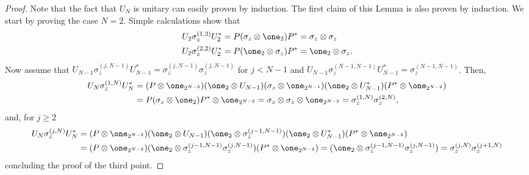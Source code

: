 \documentclass[aihp,12pt]{imsart}
\begin{document}
\begin{proof}
Note that the fact that $U_N$ is unitary can easily proven by induction.
    The first claim of this Lemma is also proven by induction. 
    We start by proving the case $N=2$. Simple calculations show that 
    \begin{align*}
        U_2\sigma_z^{(1,2)} U_2^* &= P (\sigma_z\otimes\one_2) P^* = \sigma_z\otimes\sigma_z\\
        U_2\sigma_z^{(2,2)} U_2^* &= P (\one_2\otimes\sigma_z) P^* = \one_2\otimes\sigma_z.
    \end{align*}
    Now assume that $U_{N-1}\sigma_z^{(j,N-1)}U_{N-1}^* = \sigma_z^{(j,N-1)}\sigma_z^{(j,N-1)}$ for $j<N-1$ and $U_{N-1}\sigma_z^{(N-1,N-1)}U_{N-1}^* = \sigma_z^{(N-1,N-1)}$. Then,
    \begin{align*}
        U_N\sigma_z^{(1,N)} U_N^* &= (P\otimes\one_{2^{N-2}})(\one_2\otimes U_{N-1}) (\sigma_z\otimes \one_{2^{N-1}}) (\one_2\otimes U_{N-1}^*) (P^*\otimes\one_{2^{N-2}})\\
        &= P(\sigma_z\otimes\one_2)P^* \otimes\one_{2^{N-2}} = \sigma_z\otimes\sigma_z\otimes\one_{2^{N-2}} = \sigma_z^{(1,N)}\sigma_z^{(2,N)},
    \end{align*}
    and, for $j\geq2$
    \begin{align*}
        U_N\sigma_z^{(j,N)} U_N^* &= (P\otimes\one_{2^{N-2}})(\one_2\otimes U_{N-1}) (\one_2\otimes \sigma_z^{(j-1,N-1)}) (\one_2\otimes U_{N-1}^*) (P^*\otimes\one_{2^{N-2}})\\
        &= (P\otimes\one_{2^{N-2}})(\one_2\otimes \sigma_z^{(j-1,N-1)}\sigma_z^{(j,N-1)}) (P^*\otimes\one_{2^{N-2}}) = (\one_2\otimes \sigma_z^{(j-1,N-1)}\sigma_z^{(j,N-1)}) = \sigma_z^{(j,N)}\sigma_z^{(j+1,N)}
    \end{align*}
    concluding the proof of the third point. 


\end{proof}
\end{document}
